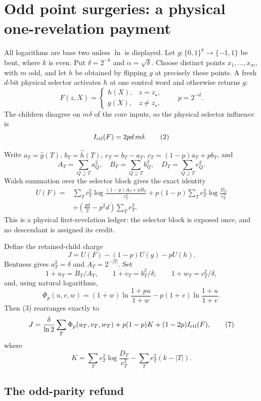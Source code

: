 \section*{Odd point surgeries: a physical one-revelation payment}

All logarithms are base two unless $\ln$ is displayed.  Let
$g:\{0,1\}^k\to\{-1,1\}$ be bent, where $k$ is even.  Put
$\delta=2^{-k}$ and $\alpha=\sqrt\delta$.  Choose distinct points
$x_1,\ldots,x_m$, with $m$ odd, and let $h$ be obtained by flipping
$g$ at precisely these points.  A fresh $d$-bit physical selector activates
$h$ at one control word and otherwise returns $g$:
\[
 F(z,X)=\begin{cases}h(X),&z=z_\star,\\g(X),&z\ne z_\star,
 \end{cases}\qquad p=2^{-d}.
\tag{1}
\]
The children disagree on $m\delta$ of the core inputs, so the physical
selector influence is
\[
 I_{\rm ctl}(F)=2pd\,m\delta.                              \tag{2}
\]

Write $a_T=\widehat g(T)$, $b_T=\widehat h(T)$,
$e_T=b_T-a_T$, $c_T=(1-p)a_T+pb_T$, and
\[
 A_T=\sum_{Q\supseteq T}a_Q^2,\quad
 B_T=\sum_{Q\supseteq T}b_Q^2,\quad
 D_T=\sum_{Q\supseteq T}e_Q^2.
\]
Walsh summation over the selector block gives the exact identity
\begin{align}
 U(F)={}&\sum_Tc_T^2\log\frac{(1-p)A_T+pB_T}{c_T^2}
 +p(1-p)\sum_Te_T^2\log\frac{D_T}{e_T^2}\\
 &+\left(\frac{pd}{2}-p^2d\right)\sum_Te_T^2.             \tag{3}
\end{align}
This is a physical first-revelation ledger: the selector block is exposed
once, and no descendant is assigned its credit.

Define the retained-child charge
\[
 J=U(F)-(1-p)U(g)-pU(h).                                  \tag{4}
\]
Bentness gives $a_T^2=\delta$ and $A_T=2^{-|T|}$.  Set
\[
 1+u_T=B_T/A_T,\qquad 1+v_T=b_T^2/\delta,
 \qquad 1+w_T=c_T^2/\delta,                               \tag{5}
\]
and, using natural logarithms,
\[
 \Phi_p(u,v,w)=(1+w)\ln\frac{1+pu}{1+w}
 -p(1+v)\ln\frac{1+u}{1+v}.                              \tag{6}
\]
Then (3) rearranges exactly to
\[
 J=\frac{\delta}{\ln2}\sum_T\Phi_p(u_T,v_T,w_T)
 +p(1-p)K+(1-2p)I_{\rm ctl}(F),                           \tag{7}
\]
where
\[
 K=\sum_Te_T^2\log\frac{D_T}{e_T^2}
   -\sum_Te_T^2(k-|T|).                                  \tag{8}
\]

\subsection*{The odd-parity refund}

